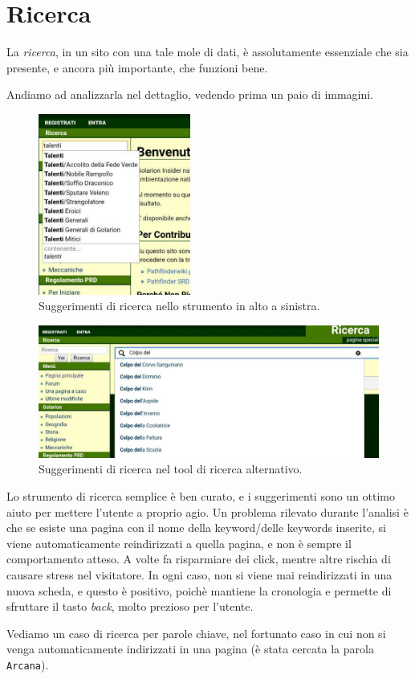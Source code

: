 \section{Ricerca}

La \emph{ricerca}, in un sito con una tale mole di dati, è assolutamente essenziale che sia 
presente, e ancora più importante, che funzioni bene.

Andiamo ad analizzarla nel dettaglio, vedendo prima un paio di immagini.

\begin{figure}[hbt]
    \centering
    \includegraphics[width=5cm]{img/ricerca1.jpg}
    \caption{Suggerimenti di ricerca nello strumento in alto a sinistra.}
\end{figure}

\begin{figure}[hbt]
    \centering
    \includegraphics[width=\textwidth]{img/ricerca2.jpg}
    \caption{Suggerimenti di ricerca nel tool di ricerca alternativo.}
\end{figure}

Lo strumento di ricerca semplice è ben curato, e i suggerimenti sono un ottimo aiuto per mettere l'utente a proprio agio.
Un problema rilevato durante l'analisi è che se esiste una pagina con il nome della keyword/delle keywords inserite,
si viene automaticamente reindirizzati a quella pagina, e non è sempre il comportamento atteso. A volte fa risparmiare dei click,
mentre altre rischia di causare stress nel visitatore. In ogni caso, non si viene mai reindirizzati in una nuova scheda, e questo
è positivo, poichè mantiene la cronologia e permette di sfruttare il tasto \emph{back}, molto prezioso per l'utente.\par
\smallskip
Vediamo un caso di ricerca per parole chiave, nel fortunato caso in cui non si venga automaticamente indirizzati in
una pagina (è stata cercata la parola \texttt{Arcana}).

